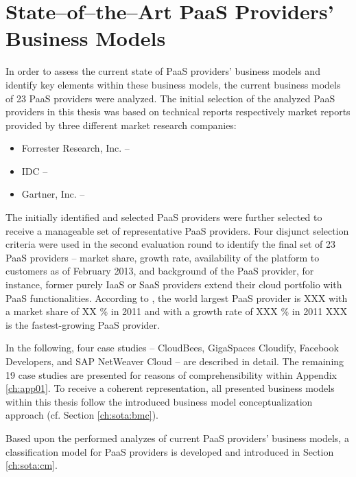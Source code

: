 \chapter{State--of--the--Art PaaS Providers' Business Models}\label{ch:sota}

In order to assess the current state of \ac{PaaS} providers' business models and identify key elements within these business models, the current business models of 23 \ac{PaaS} providers were analyzed. The initial selection of the analyzed \ac{PaaS} providers in this thesis was based on technical reports respectively market reports provided by three different market research companies:
\begin{itemize}
	\item Forrester Research, Inc. -- \citet{Ried2011a,Rymer2011}
	\item \ac{IDC} -- \citet{Bradshaw2012,Hendrick2012, Hendrick2012a}
	\item Gartner, Inc. -- \citet{Smith2012}
\end{itemize}
The initially identified and selected \ac{PaaS} providers were further selected to receive a manageable set of representative \ac{PaaS} providers. Four disjunct selection criteria were used in the second evaluation round to identify the final set of 23 \ac{PaaS} providers -- market share, growth rate, availability of the platform to customers as of February 2013, and background of the \ac{PaaS} provider, for instance, former purely \ac{IaaS} or \ac{SaaS} providers extend their cloud portfolio with \ac{PaaS} functionalities. According to \citet{}, the world largest \ac{PaaS} provider is XXX with a market share of XX \% in 2011 and with a growth rate of XXX \% in 2011 XXX is the fastest-growing \ac{PaaS} provider.

In the following, four case studies -- CloudBees, GigaSpaces Cloudify, Facebook Developers, and SAP NetWeaver Cloud -- are described in detail. The remaining 19 case studies are presented for reasons of comprehensibility within Appendix \ref{ch:app01}. To receive a coherent representation, all presented business models within this thesis follow the introduced business model conceptualization approach (cf. Section \ref{ch:sota:bmc}).

Based upon the performed analyzes of current \ac{PaaS} providers' business models, a classification model for \ac{PaaS} providers is developed and introduced in Section \ref{ch:sota:cm}.

